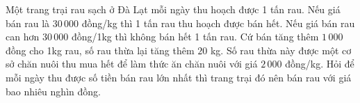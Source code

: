 \begin{bt}%
	Một trang trại rau sạch ở Đà  Lạt mỗi ngày thu hoạch được 1 tấn rau. Nếu giá bán rau là $30\,000$ đồng/kg thì 1 tấn rau thu hoạch được bán hết. Nếu giá bán rau can hơn $30\,000$ đồng/1kg thì không bán hết 1 tấn rau. Cứ bán tăng thêm $1\,000$ đồng cho 1kg rau, số rau thừa lại tăng thêm $20$ kg. Số rau thừa này được một cơ sở chăn nuôi thu mua hết để làm thức ăn chăn nuôi với giá $2\,000$ đồng/kg. Hỏi để mỗi ngày thu được số tiền bán rau lớn nhất thì trang trại đó nên bán rau với giá bao nhiêu nghìn đồng. 
\end{bt}

